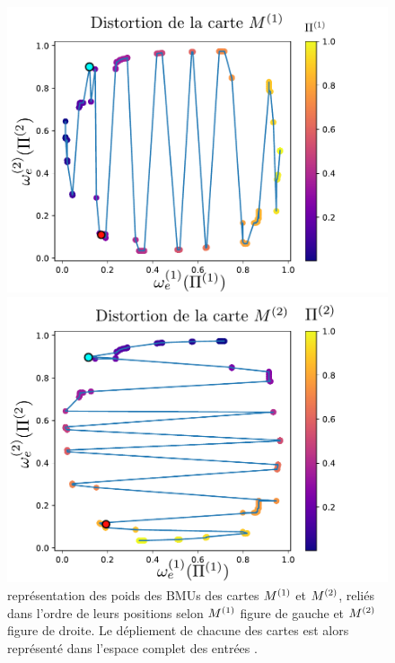\begin{figure}
    \begin{minipage}{0.49\textwidth}
    \includegraphics[width=\textwidth]{disto_cercle_M1.pdf}
    \end{minipage}
    \begin{minipage}{0.49\textwidth}
    \includegraphics[width=\textwidth]{disto_cercle_M2.pdf}
    \end{minipage}
    \caption{représentation des poids des BMUs des cartes $M^{({1})}$ et $M^{({2})}$, reliés dans l'ordre de leurs positions selon $M^{({1})}$ figure de gauche et $M^{({2})}$ figure de droite. Le dépliement de chacune des cartes est alors représenté dans l'espace complet des entrées \label{fig:distortion}.}
    \end{figure}





